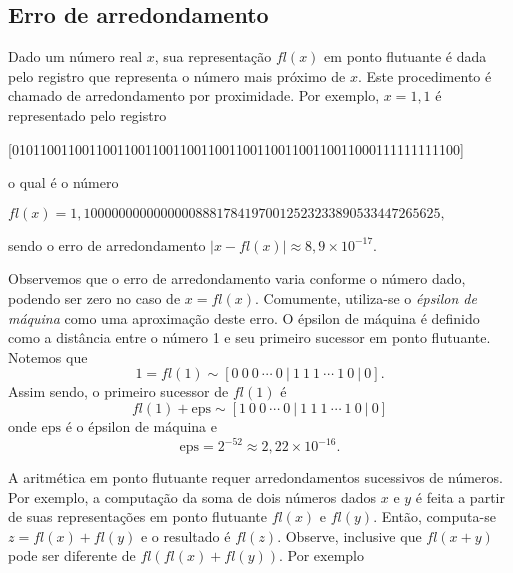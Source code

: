 \subsection{Erro de arredondamento}

Dado um número real $x$, sua representação $fl(x)$ em ponto flutuante é dada pelo registro que representa o número mais próximo de $x$. Este procedimento é chamado de arredondamento por proximidade. Por exemplo, $x = 1,1$ é representado pelo registro
\begin{small}
  \begin{center}
    [0101100110011001100110011001100110011001100110011000111111111100]
  \end{center}
\end{small}
o qual é o número 
\begin{small}
  \begin{center}
    $fl(x) = 1,100000000000000088817841970012523233890533447265625,$
  \end{center}
\end{small}
sendo o erro de arredondamento $|x - fl(x)| \approx 8,9\times 10^{-17}$.

Observemos que o erro de arredondamento varia conforme o número dado, podendo ser zero no caso de $x = fl(x)$. Comumente, utiliza-se o \emph{épsilon de máquina} como uma aproximação deste erro. O épsilon de máquina é definido como a distância entre o número 1 e seu primeiro sucessor em ponto flutuante. Notemos que
\begin{equation}
  1 = fl(1) \sim [0 ~ 0 ~ 0 ~ \cdots ~ 0 ~ | ~ 1 ~ 1 ~ 1 ~ \cdots ~ 1 ~ 0 ~ | ~ 0].
\end{equation}
Assim sendo, o primeiro sucessor de $fl(1)$ é
\begin{equation}
  fl(1)+\mathrm{eps} \sim [1 ~ 0 ~ 0 ~ \cdots ~ 0 ~ | ~ 1 ~ 1 ~ 1 ~ \cdots ~ 1 ~ 0 ~ | ~ 0]
\end{equation}
onde $\mathrm{eps}$ é o épsilon de máquina e
\begin{equation}
  \mathrm{eps} = 2^{-52} \approx 2,22\times 10^{-16}.
\end{equation}


A aritmética em ponto flutuante requer arredondamentos sucessivos de números. Por exemplo, a computação da soma de dois números dados $x$ e $y$ é feita a partir de suas representações em ponto flutuante $fl(x)$ e $fl(y)$. Então, computa-se $z = fl(x)+fl(y)$ e o resultado é $fl(z)$. Observe, inclusive que $fl(x+y)$ pode ser diferente de $fl(fl(x)+fl(y))$. Por exemplo

